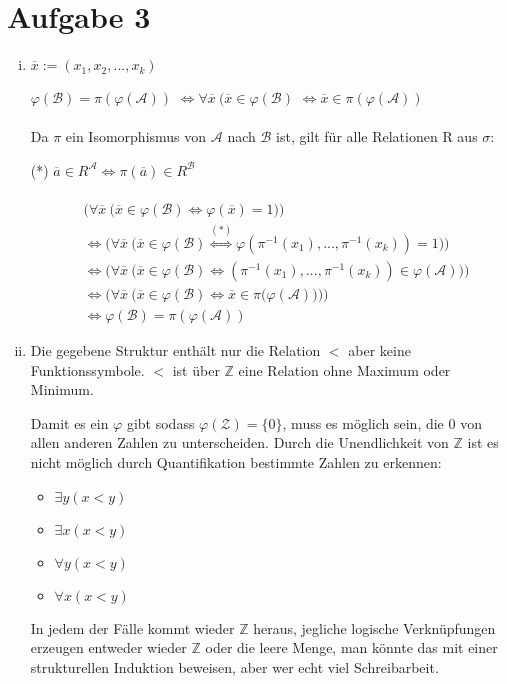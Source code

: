 \documentclass[a4paper,10pt]{article}
\newcommand{\Z}{\mathbb{Z}}
\begin{document}
\section*{Aufgabe 3}
\begin{enumerate}[(i)]
\item
$\overline{x} := (x_1,x_2,...,x_k)$

$\varphi(\mathcal{B}) = \pi(\varphi(\mathcal{A}))$
$\Leftrightarrow \forall \overline{x}~ (\overline{x} \in \varphi(\mathcal{B})$
$\Leftrightarrow \overline{x} \in \pi(\varphi(\mathcal{A}))$
\\
\\
Da $\pi$ ein Isomorphismus von $\mathcal{A}$ nach $\mathcal{B}$ ist, gilt für alle Relationen R aus $\sigma$: 

(*) $\overline{a} \in R^{\mathcal{A}} \Leftrightarrow \pi(\overline{a}) \in R^{\mathcal{B}}$
\\
\\
\begin{align*}
&\big(\forall \overline{x}~ \big( \overline{x} \in \varphi(\mathcal{B})  \Leftrightarrow \varphi(\overline{x}) =1\big)\big) \\
&\Leftrightarrow \big(\forall \overline{x}~ \big( \overline{x} \in \varphi(\mathcal{B})  \overset{(*)}{\Leftrightarrow} \varphi(\pi^{-1}(x_1),...,\pi^{-1}(x_k)) = 1\big)\big) \\
&\Leftrightarrow \big(\forall \overline{x}~ \big( \overline{x} \in \varphi(\mathcal{B})  \Leftrightarrow (\pi^{-1}(x_1),...,\pi^{-1}(x_k)) \in \varphi(\mathcal{A}))\big) \\ 
&\Leftrightarrow \big(\forall \overline{x}~ \big( \overline{x} \in \varphi(\mathcal{B})  \Leftrightarrow \overline{x} \in \pi(\varphi(\mathcal{A}) \big)\big)\big) \\
&\Leftrightarrow \varphi(\mathcal{B}) = \pi(\varphi(\mathcal{A}))
\end{align*}


\item
Die gegebene Struktur enthält nur die Relation $<$ aber keine Funktionssymbole. 
$<$ ist über $\mathbb{Z}$ eine Relation ohne Maximum oder Minimum. 

Damit es ein $\varphi$ gibt sodass $\varphi(\mathcal{Z}) = \lbrace 0 \rbrace$, muss es möglich sein, die $0$ von allen anderen Zahlen zu unterscheiden. Durch die Unendlichkeit von $\mathbb{Z}$ ist es nicht möglich durch Quantifikation bestimmte Zahlen zu erkennen:
\begin{itemize}
\item
$\exists y (x < y)$
\item
$\exists x (x < y)$
\item
$\forall y (x < y)$
\item
$\forall x (x < y)$
\end{itemize}
In jedem der Fälle kommt wieder $\Z$ heraus, jegliche logische Verknüpfungen erzeugen entweder wieder $\Z$ oder die leere Menge, man könnte das mit einer strukturellen Induktion beweisen, aber wer echt viel Schreibarbeit.


\end{enumerate}
\end{document}
